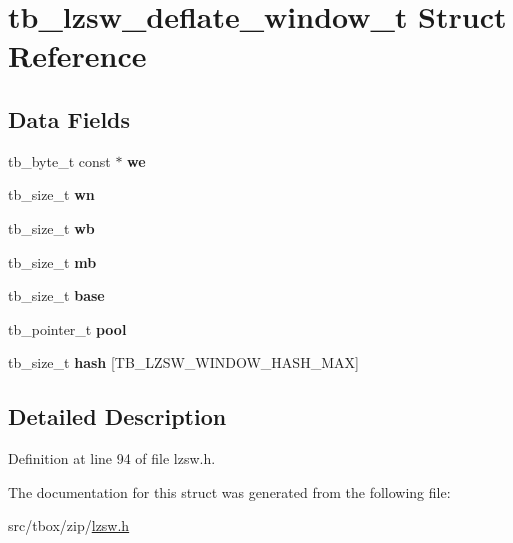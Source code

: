 \hypertarget{structtb__lzsw__deflate__window__t}{\section{tb\-\_\-lzsw\-\_\-deflate\-\_\-window\-\_\-t Struct Reference}
\label{structtb__lzsw__deflate__window__t}
}
\subsection*{Data Fields}
\begin{DoxyCompactItemize}
\item 
\hypertarget{structtb__lzsw__deflate__window__t_a11a82cf38b5b5b80ecbc6003d87bd736}{tb\-\_\-byte\-\_\-t const $\ast$ {\bfseries we}}\label{structtb__lzsw__deflate__window__t_a11a82cf38b5b5b80ecbc6003d87bd736}

\item 
\hypertarget{structtb__lzsw__deflate__window__t_a5189ae291d58abf1653381789a01065b}{tb\-\_\-size\-\_\-t {\bfseries wn}}\label{structtb__lzsw__deflate__window__t_a5189ae291d58abf1653381789a01065b}

\item 
\hypertarget{structtb__lzsw__deflate__window__t_a345facbe018eea4b91b1a6515013fb24}{tb\-\_\-size\-\_\-t {\bfseries wb}}\label{structtb__lzsw__deflate__window__t_a345facbe018eea4b91b1a6515013fb24}

\item 
\hypertarget{structtb__lzsw__deflate__window__t_a111ee88095d056853947589d34e2bcb1}{tb\-\_\-size\-\_\-t {\bfseries mb}}\label{structtb__lzsw__deflate__window__t_a111ee88095d056853947589d34e2bcb1}

\item 
\hypertarget{structtb__lzsw__deflate__window__t_aeba4c234f8b13abc77f118ba54fb147e}{tb\-\_\-size\-\_\-t {\bfseries base}}\label{structtb__lzsw__deflate__window__t_aeba4c234f8b13abc77f118ba54fb147e}

\item 
\hypertarget{structtb__lzsw__deflate__window__t_aa167b968c7ee801b9cf888668124a318}{tb\-\_\-pointer\-\_\-t {\bfseries pool}}\label{structtb__lzsw__deflate__window__t_aa167b968c7ee801b9cf888668124a318}

\item 
\hypertarget{structtb__lzsw__deflate__window__t_affe3af7fe86fac1cc47798a3c22410a5}{tb\-\_\-size\-\_\-t {\bfseries hash} \mbox{[}T\-B\-\_\-\-L\-Z\-S\-W\-\_\-\-W\-I\-N\-D\-O\-W\-\_\-\-H\-A\-S\-H\-\_\-\-M\-A\-X\mbox{]}}\label{structtb__lzsw__deflate__window__t_affe3af7fe86fac1cc47798a3c22410a5}

\end{DoxyCompactItemize}


\subsection{Detailed Description}


Definition at line 94 of file lzsw.\-h.



The documentation for this struct was generated from the following file\-:\begin{DoxyCompactItemize}
\item 
src/tbox/zip/\hyperlink{lzsw_8h}{lzsw.\-h}\end{DoxyCompactItemize}
